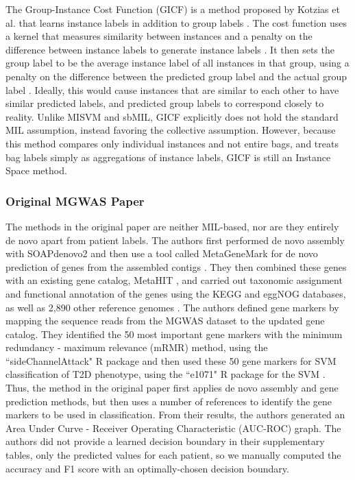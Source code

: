 The Group-Instance Cost Function (GICF) is a method proposed by Kotzias et al. that learns instance labels in addition to group labels \cite{kotzias15}. The cost function uses a kernel that measures similarity between instances and a penalty on the difference between instance labels to generate instance labels \cite{kotzias15}. It then sets the group label to be the average instance label of all instances in that group, using a penalty on the difference between the predicted group label and the actual group label \cite{kotzias15}. Ideally, this would cause instances that are similar to each other to have similar predicted labels, and predicted group labels to correspond closely to reality. Unlike MISVM and sbMIL, GICF explicitly does not hold the standard MIL assumption, instead favoring the collective assumption. However, because this method compares only individual instances and not entire bags, and treats bag labels simply as aggregations of instance labels, GICF is still an Instance Space method.

\subsubsection{Original MGWAS Paper}

The methods in the original paper are neither MIL-based, nor are they entirely de novo apart from patient labels. The authors first performed de novo assembly with SOAPdenovo2 \cite{luo12} and then use a tool called MetaGeneMark \cite{zhu10, besemer99} for de novo prediction of genes from the assembled contigs \cite{qin041012}. They then combined these genes with an existing gene catalog, MetaHIT \cite{qin030410}, and carried out taxonomic assignment and functional annotation of the genes using the KEGG \cite{kanehisa00} and eggNOG \cite{powell12} databases, as well as 2,890 other reference genomes \cite{qin041012}. The authors defined gene markers by mapping the sequence reads from the MGWAS dataset to the updated gene catalog. They identified the 50 most important gene markers with the minimum redundancy - maximum relevance (mRMR) \cite{peng05} method, using the ``sideChannelAttack" R package and then used these 50 gene markers for SVM classification of T2D phenotype, using the ``e1071" R package for the SVM \cite{qin041012}. Thus, the method in the original paper first applies de novo assembly and gene prediction methods, but then uses a number of references to identify the gene markers to be used in classification. From their results, the authors generated an Area Under Curve - Receiver Operating Characteristic (AUC-ROC) graph. The authors did not provide a learned decision boundary in their supplementary tables, only the predicted values for each patient, so we manually computed the accuracy and F1 score with an optimally-chosen decision boundary. 

